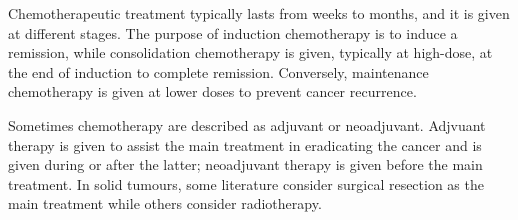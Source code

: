 Chemotherapeutic treatment typically lasts from weeks to months, and it is given at different stages. The purpose of induction chemotherapy is to induce a remission, while consolidation chemotherapy is given, typically at high-dose, at the end of induction to complete remission. Conversely, maintenance chemotherapy is given at lower doses to prevent cancer recurrence.

Sometimes chemotherapy are described as adjuvant or neoadjuvant. Adjvuant therapy is given to assist the main treatment in eradicating the cancer and is given during or after the latter; neoadjuvant therapy is given before the main treatment. In solid tumours, some literature consider surgical resection as the main treatment while others consider radiotherapy.
